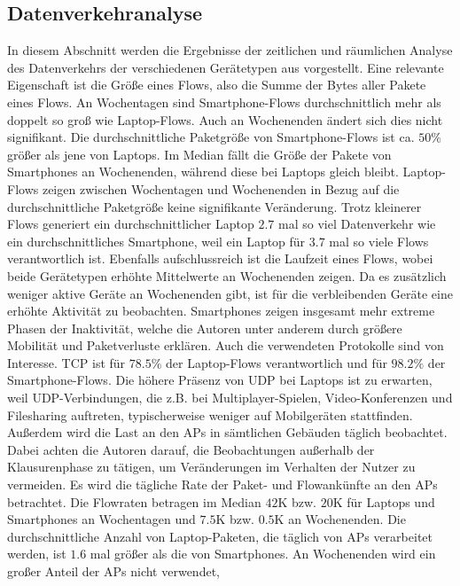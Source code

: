 \documentclass[12pt, a4paper]{article}
\begin{document}
\subsection{Datenverkehranalyse}
\label{sec:phase2_b}

In diesem Abschnitt werden die Ergebnisse der zeitlichen und räumlichen Analyse des Datenverkehrs der verschiedenen Gerätetypen
aus \cite{Alipour2018} vorgestellt. Eine relevante Eigenschaft ist die Größe eines Flows, also die Summe der Bytes aller
Pakete eines Flows. An Wochentagen sind Smartphone-Flows durchschnittlich mehr als doppelt so groß wie Laptop-Flows.
Auch an Wochenenden ändert sich dies nicht signifikant. Die durchschnittliche Paketgröße von Smartphone-Flows
ist ca. $50 \%$ größer als jene von Laptops. Im Median fällt die Größe der Pakete von Smartphones an Wochenenden, 
während diese bei Laptops gleich bleibt. Laptop-Flows zeigen zwischen Wochentagen und Wochenenden in Bezug auf die 
durchschnittliche Paketgröße keine signifikante Veränderung. Trotz kleinerer Flows generiert ein durchschnittlicher Laptop $2.7$
mal so viel Datenverkehr wie ein durchschnittliches Smartphone, weil ein Laptop für $3.7$ mal so viele Flows verantwortlich ist.
Ebenfalls aufschlussreich ist die Laufzeit eines Flows, wobei beide Gerätetypen erhöhte Mittelwerte an Wochenenden zeigen.
Da es zusätzlich weniger aktive Geräte an Wochenenden gibt, ist für die verbleibenden Geräte eine erhöhte Aktivität
zu beobachten. Smartphones zeigen insgesamt mehr extreme Phasen der Inaktivität, welche die Autoren unter anderem durch größere
Mobilität und Paketverluste erklären. Auch die verwendeten Protokolle sind von Interesse. 
TCP ist für $78.5 \%$ der Laptop-Flows verantwortlich und für $98.2 \%$ der Smartphone-Flows. 
Die höhere Präsenz von UDP bei Laptops ist zu erwarten, weil UDP-Verbindungen, die z.B. bei Multiplayer-Spielen, 
Video-Konferenzen und Filesharing auftreten, typischerweise weniger auf Mobilgeräten stattfinden. \cite{Alipour2018}
Außerdem wird die Last an den APs in sämtlichen Gebäuden täglich beobachtet. Dabei achten die Autoren darauf,
die Beobachtungen außerhalb der Klausurenphase zu tätigen, um Veränderungen im Verhalten der Nutzer zu vermeiden.
Es wird die tägliche Rate der Paket- und Flowankünfte an den APs betrachtet. Die Flowraten betragen im Median
$42$\textsc{K} bzw. $20$\textsc{K} für Laptops und Smartphones an Wochentagen und $7.5$\textsc{K} bzw. $0.5$\textsc{K}
an Wochenenden. Die durchschnittliche Anzahl von Laptop-Paketen, die täglich von APs verarbeitet werden,
ist $1.6$ mal größer als die von Smartphones. An Wochenenden wird ein großer Anteil der APs nicht verwendet,
\end{document}
